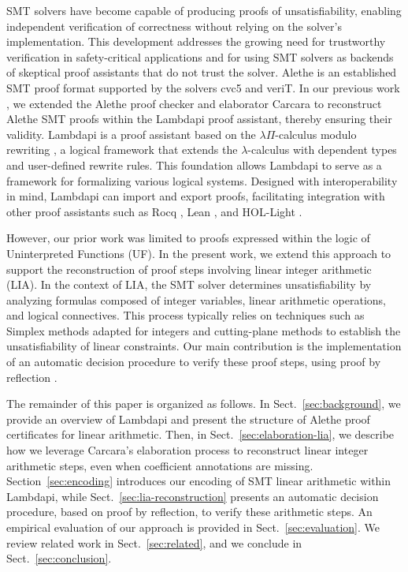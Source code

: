 \documentclass[runningheads,envcountsame]{llncs}
\begin{document}
SMT solvers have become capable of producing proofs of unsatisfiability,  enabling independent verification of correctness without relying on the solver's implementation.
This development addresses the growing need for trustworthy verification in safety-critical applications and for using SMT solvers as backends of skeptical proof assistants that do not trust the solver.
Alethe \cite{alethe,alethespec} is an established SMT proof format supported by the solvers cvc5 and veriT. In our previous work \cite{ColtellacciMD24}, we extended the Alethe proof checker and elaborator Carcara \cite{carcara} to
reconstruct Alethe SMT proofs within the Lambdapi proof assistant, thereby ensuring their validity.
Lambdapi \cite{lambdapi} is a proof assistant based on the $\lambda\Pi$-calculus modulo rewriting \cite{lpmodulo}, a logical framework \cite{lf} that extends the $\lambda$-calculus with dependent types and user-defined rewrite rules.
This foundation allows Lambdapi to serve as a framework for formalizing various logical systems.
Designed with interoperability in mind, Lambdapi can import and export proofs, facilitating integration with other proof assistants such as Rocq \cite{Rocq-refman}, Lean \cite{lean4:2021}, and HOL-Light \cite{LPAR2024:Translating_HOL_Light_proofs}. 

However, our prior work was limited to proofs expressed within the logic of Uninterpreted Functions (UF).
In the present work, we extend this approach to support the reconstruction of proof steps involving linear integer arithmetic (LIA).
In the context of LIA, the SMT solver determines unsatisfiability by analyzing formulas composed of integer variables, linear arithmetic operations, and logical connectives.
This process typically relies on techniques such as Simplex methods adapted for integers \cite{SRI:simplex:dpllt} and cutting-plane methods  to establish the unsatisfiability of linear constraints.
Our main contribution is the implementation of an automatic decision procedure to verify these proof steps, using proof by reflection \cite{reflection-origin-coq,ring-coq}.

The remainder of this paper is organized as follows.
In Sect.~\ref{sec:background}, we provide an overview of Lambdapi and present the structure of Alethe proof certificates for linear arithmetic.
Then, in Sect.~\ref{sec:elaboration-lia}, we describe how we leverage Carcara's elaboration process to reconstruct linear integer arithmetic steps, even when coefficient annotations are missing.
Section~\ref{sec:encoding} introduces our encoding of SMT linear arithmetic within Lambdapi, while Sect.~\ref{sec:lia-reconstruction} presents an automatic decision procedure, based on proof by reflection, to verify these arithmetic steps.
An empirical evaluation of our approach is provided in Sect.~\ref{sec:evaluation}. We review related work in Sect.~\ref{sec:related}, and we conclude in Sect.~\ref{sec:conclusion}.
\end{document}
